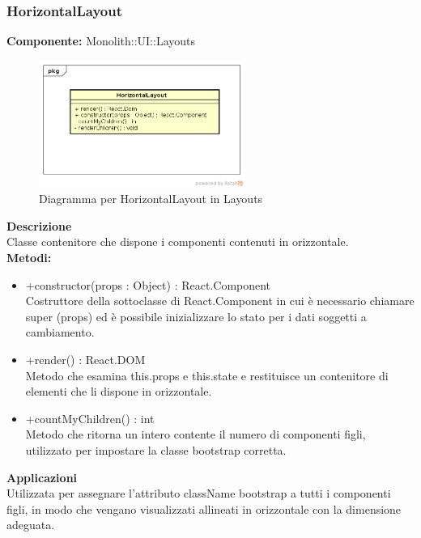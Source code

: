 \subsubsection{HorizontalLayout}
\textbf{Componente:}  Monolith::UI::Layouts\\
   \FloatBarrier
   \begin{figure}[ht]
   \centering
   \includegraphics[width=0.6\textwidth]{img/single-HorizontalLayout.png}
   \caption{{Diagramma per HorizontalLayout in Layouts}}
\end{figure}
\FloatBarrier
\textbf{Descrizione}\\
Classe contenitore che dispone i componenti contenuti in orizzontale. \\
\textbf{Metodi:}
\begin{itemize}

\item +constructor(props : Object) : React.Component 
\\
Costruttore della sottoclasse di React.Component in cui è necessario chiamare super (props) ed è possibile inizializzare lo stato per i dati soggetti a cambiamento.

\item +render() : React.DOM 
\\
Metodo che esamina this.props e this.state e restituisce un contenitore di elementi che li dispone in orizzontale.

\item +countMyChildren() : int \\
Metodo che ritorna un intero contente il numero di componenti figli, utilizzato per impostare la classe bootstrap corretta.

\end{itemize} 


\textbf{Applicazioni}\\
Utilizzata per assegnare l'attributo className bootstrap a tutti i componenti figli, in modo che vengano visualizzati allineati in orizzontale con la dimensione adeguata. 


